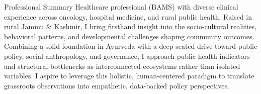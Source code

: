 \begin{rubric}{Professional Summary}
\entry*[]
 Healthcare professional (BAMS) with diverse clinical experience across oncology, hospital medicine, and rural public health. Raised in rural Jammu \& Kashmir, I bring firsthand insight into the socio-cultural realities, behavioral patterns, and developmental challenges shaping community outcomes. Combining a solid foundation in Ayurveda with a deep-seated drive toward public policy, social anthropology, and governance, I approach public health indicators and structural bottlenecks as interconnected ecosystems rather than isolated variables. I aspire to leverage this holistic, human-centered paradigm to translate grassroots observations into empathetic, data-backed policy perspectives.
\end{rubric}